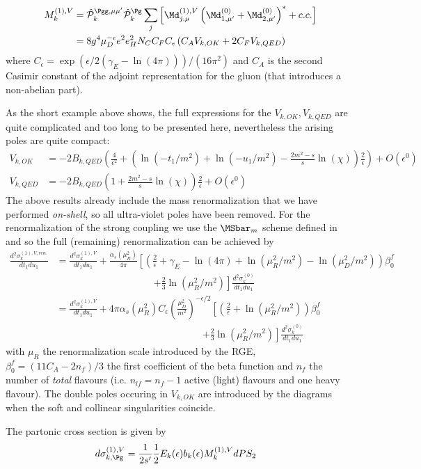 
\begin{align}
M_k^{(1),V}&=\hat {\mathcal P}_{k}^{\Pgg,\mu\mu'}\hat {\mathcal P}_{k}^{\Pg}\sum_{j}\left[\Md^{(1),V}_{j,\mu}\left(\Md^{(0)}_{1,\mu'}+\Md^{(0)}_{2,\mu'}\right)^*+c.c.\right] \nonumber\\
 &= 8g^4\mu_D^{-\epsilon}e^2e_H^2 N_C C_FC_\epsilon\left( C_A V_{k,OK} + 2C_F V_{k,QED}\right)
\end{align}
where $C_\epsilon = \exp(\epsilon/2(\gamma_E-\ln(4\pi)))/(16\pi^2)$ and $C_A$ is the second Casimir constant of the adjoint representation for the gluon (that introduces a non-abelian part).

As the short example above shows, the full expressions for the $V_{k,OK},V_{k,QED}$ are quite complicated and too long to be presented here, nevertheless the arising poles are quite compact:
\begin{align}
V_{k,OK} &= -2B_{k,QED}\left(\frac 4 {\epsilon^2} + \left(\ln(-t_1/m^2) + \ln(-u_1/m^2) -\frac{2m^2-s}{s}\ln(\chi)\right)\frac 2 \epsilon \right) + O(\epsilon^0)\\
V_{k,QED} &= -2B_{k,QED}\left(1+\frac{2m^2-s}{s}\ln(\chi)\right)\frac 2 \epsilon + O(\epsilon^0)
\end{align}
The above results already include the mass renormalization that we have performed \textit{on-shell}, so all ultra-violet poles have been removed. For the renormalization of the strong coupling we use the $\MSbar_m$ scheme defined in \cite{Bojak:2000eu} and so the full (remaining) renormalization can be achieved by
\begin{align}
\frac{d^2\sigma_{k}^{(1),V,ren.}}{dt_1du_1} &=\frac{d^2\sigma_{k}^{(1),V}}{dt_1du_1} + \frac{\alpha_s(\mu_R^2)}{4\pi}\left[\left(\frac 2 \epsilon + \gamma_E-\ln(4\pi)+\ln(\mu_R^2/m^2)-\ln(\mu_D^2/m^2)\right)\beta_0^f \right.\nonumber\\
 &\hspace{120pt}\left.+\frac 2 3 \ln(\mu_R^2/m^2)\right]\frac{d^2\sigma_{k}^{(0)}}{dt_1du_1}\\
&=\frac{d^2\sigma_{k}^{(1),V}}{dt_1du_1} + 4\pi\alpha_s(\mu_R^2)C_\epsilon\left(\frac{\mu_D^2}{m^2}\right)^{-\epsilon/2}\left[\left(\frac 2 \epsilon +\ln(\mu_R^2/m^2)\right)\beta_0^f \right.\nonumber\\
 &\hspace{180pt}\left.+\frac 2 3 \ln(\mu_R^2/m^2)\right]\frac{d^2\sigma_{k}^{(0)}}{dt_1du_1}
\end{align}
with $\mu_R$ the renormalization scale introduced by the RGE, $\beta_0^f = (11C_A- 2n_{f})/3$ the first coefficient of the beta function and $n_f$ the number of \textit{total} flavours (i.e. $n_{lf}=n_f-1$ active (light) flavours and one heavy flavour). The double poles occuring in $V_{k,OK}$ are introduced by the diagrams  when the soft and collinear singularities coincide.

The partonic cross section is given by
\begin{align}
d\sigma_{k,\Pg}^{(1),V} &= \frac 1 {2s'}\frac 1 2 E_k(\epsilon) b_k(\epsilon) M_k^{(1),V} dPS_2
\end{align}

